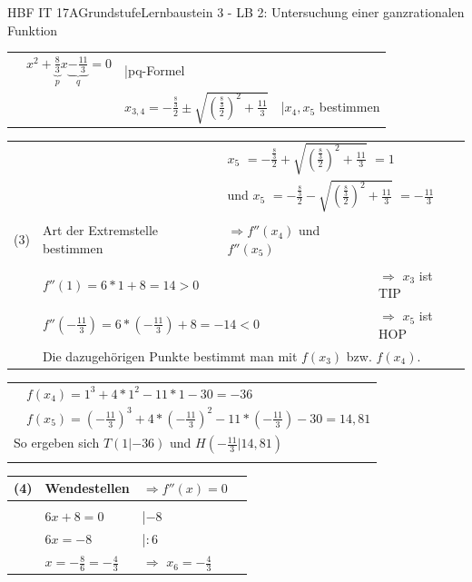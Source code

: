 \documentclass[oneside,openany,headings=optiontotoc,11pt,numbers=noenddot]{scrreprt}
\begin{document}
\begin{worksheet}{HBF IT 17A}{Grundstufe}{Lernbaustein 3 - LB 2: Untersuchung einer ganzrationalen Funktion}
\begin{framed}
\begin{tabularx}{\textwidth}{lXXl}
				& \(x^2 +\underbrace{\frac{8}{3}}_{p}x \underbrace{-\frac{11}{3}}_{q} = 0\) & |pq-Formel\\
				& & \(x_{3,4} = -\frac{\frac{8}{3}}{2} \pm \sqrt{\left(\frac{\frac{8}{3}}{2}\right)^2 +\frac{11}{3}}\) & |\(x_4,x_5\) bestimmen\\
			\end{tabularx}
			\begin{tabularx}{\textwidth}{lXXl}
				& & \multicolumn{2}{l}{\colorbox{green!10}{\(x_5\)} \(= -\frac{\frac{8}{3}}{2} + \sqrt{\left(\frac{\frac{8}{3}}{2}\right)^2 +\frac{11}{3}}\) \colorbox{green!10}{\(= 1\)}}\\
				& & \multicolumn{2}{l}{und \colorbox{green!10}{\(x_5\)} \(= -\frac{\frac{8}{3}}{2} - \sqrt{\left(\frac{\frac{8}{3}}{2}\right)^2 +\frac{11}{3}}\) \colorbox{green!10}{\(= -\frac{11}{3}\)}}\\
				\\
				(3) & Art der Extremstelle bestimmen & \(\Rightarrow f''(x_4)\) und \(f''(x_5)\)\\
				\hline\\				 
				& \multicolumn{2}{l}{\(f''(1) =  6*1 +8 = 14 > 0\)} & \(\Rightarrow\) \colorbox{green!10}{\(x_3\) ist TIP}\\
				& \multicolumn{2}{l}{\(f''(-\frac{11}{3}) = 6*(-\frac{11}{3}) + 8 = -14 < 0\)} & \(\Rightarrow\) \colorbox{green!10}{\(x_5\) ist HOP}\\
				& \multicolumn{3}{l}{Die dazugehörigen Punkte bestimmt man mit \(f(x_3)\) bzw. \(f(x_4)\).}\\
			\end{tabularx}
			\begin{tabularx}{\textwidth}{ll}
				& \(f(x_4) = 1^3 +4*1^2-11*1-30 = -36\)\\
				& \(f(x_5) = (-\frac{11}{3})^3 +4*(-\frac{11}{3})^2-11*(-\frac{11}{3})-30 = 14,81\)\\
				\multicolumn{2}{l}{So ergeben sich \colorbox{blue!5}{\(T(1|-36)\)} und \colorbox{blue!5}{\(H(-\frac{11}{3}|14,81)\)}}\\
				\hline\hline\\
			\end{tabularx}
			\begin{tabularx}{\textwidth}{lXXl}
				(4) & Wendestellen & \(\Rightarrow f''(x) = 0\)\\
				\hline\\
				& \(6x +8 = 0\) & |\(-8\)\\
				& \(6x = -8\) & |\(:6\)\\
				& \(x = -\frac{8}{6} = -\frac{4}{3}\) & \(\Rightarrow\) \colorbox{green!10}{\(x_6 = -\frac{4}{3}\)}\\

\end{tabularx}
\end{framed}
\end{worksheet}
\end{document}

